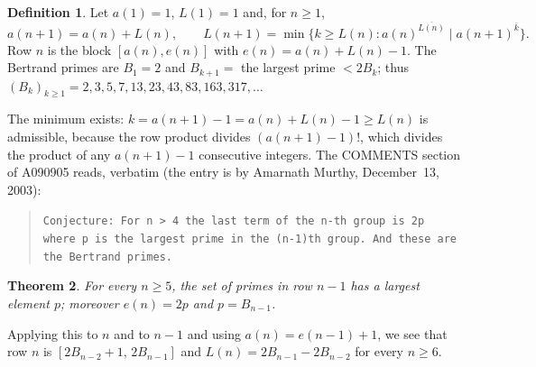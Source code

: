 \documentclass[11pt]{amsart}
\theoremstyle{plain}
\newtheorem{theorem}{Theorem}
\theoremstyle{definition}
\newtheorem{definition}[theorem]{Definition}
\newcommand{\rf}[2]{#1^{\overline{#2}}}
\begin{document}
\begin{definition}\label{def:tri}
Let $a(1)=1$, $L(1)=1$ and, for $n\ge1$,
\[
a(n+1)=a(n)+L(n),\qquad L(n+1)=\min\{k\ge L(n): \rf{a(n)}{L(n)}\mid \rf{a(n+1)}{k}\}.
\]
Row $n$ is the block $[a(n),e(n)]$ with $e(n)=a(n)+L(n)-1$. The Bertrand primes are $B_1=2$ and $B_{k+1}=$ the largest prime $<2B_k$; thus $(B_k)_{k\ge1}=2,3,5,7,13,23,43,83,163,317,\dots$
\end{definition}

The minimum exists: $k=a(n+1)-1=a(n)+L(n)-1\ge L(n)$ is admissible, because the row product divides $(a(n+1)-1)!$, which divides the product of any $a(n+1)-1$ consecutive integers. The COMMENTS section of A090905 reads, verbatim (the entry is by Amarnath Murthy, December~13, 2003):
\begin{quote}
{\small\raggedright\texttt{Conjecture: For n > 4 the last term of the n-th group is 2p where p is the largest prime in the (n-1)th group. And these are the Bertrand primes.}\par}
\end{quote}

\begin{theorem}\label{thm:main}
For every $n\ge5$, the set of primes in row $n-1$ has a largest element $p$; moreover $e(n)=2p$ and $p=B_{n-1}$.
\end{theorem}

Applying this to $n$ and to $n-1$ and using $a(n)=e(n-1)+1$, we see that row $n$ is $[2B_{n-2}+1,\,2B_{n-1}]$ and $L(n)=2B_{n-1}-2B_{n-2}$ for every $n\ge6$.
\end{document}
